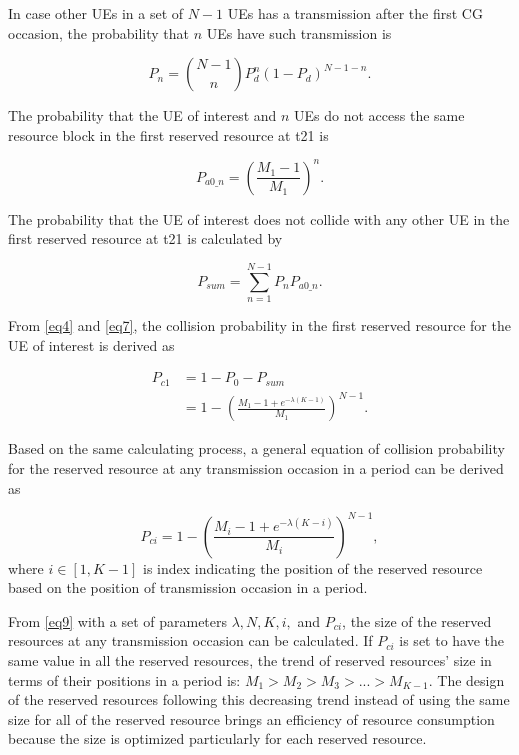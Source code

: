 \documentclass{ieeeaccess}
\begin{document}
In case other UEs in a set of $N-1$ UEs has a transmission after the first CG occasion, the probability that $n$  UEs have such transmission is 

\begin{equation}
P_{n} = \binom {N-1}{n}P_{d}^{n}(1-P_{d})^{N-1-n}.\label{eq5}
\end{equation}

The probability that the UE of interest and $n$ UEs do not access the same resource block in the first reserved resource at t21 is 

\begin{equation}
P_{a0\_n} = \left(\frac {M_{1}-1}{M_{1}}\right)^{n}.\label{eq6}
\end{equation}

The probability that the UE of interest does not collide with any other UE in the first reserved resource at t21 is calculated by 

\begin{equation}
P_{sum} = \sum_{n=1}^{N-1} P_{n}P_{a0\_n}.\label{eq7}
\end{equation}

From \eqref{eq4} and \eqref{eq7}, the collision probability in the first reserved resource for the UE of interest is derived as 

\begin{align}
P_{c1} &= 1 - P_{0} - P_{sum} \nonumber\\
 &= 1 - \left(\frac{M_{1}-1+e^{-\lambda(K-1)}}{M_{1}}\right)^{N-1}.\label{eq8}
\end{align}

Based on the same calculating process, a general equation of collision probability for the reserved resource at any transmission occasion in a period can be derived as 

\begin{equation}
P_{ci} = 1 - \left(\frac{M_{i}-1+e^{-\lambda(K-i)}}{M_{i}}\right)^{N-1},\label{eq9}
\end{equation}
where
$i \in [1, K-1]$ is index indicating the position of the reserved resource based on the position of transmission occasion in a period.

From \eqref{eq9} with a set of parameters  $\lambda, N, K, i,$ and $P_{ci}$, the size of the reserved resources at any transmission occasion can be calculated. If $P_{ci}$ is set to have the same value in all the reserved resources, the trend of reserved resources' size in terms of their positions in a period is: $M_1 > M_2 > M_3 > ... > M_{K-1}$. The design of the reserved resources following this decreasing trend instead of using the same size for all of the reserved resource brings an efficiency of resource consumption because the size is optimized particularly for each reserved resource.
\end{document}
